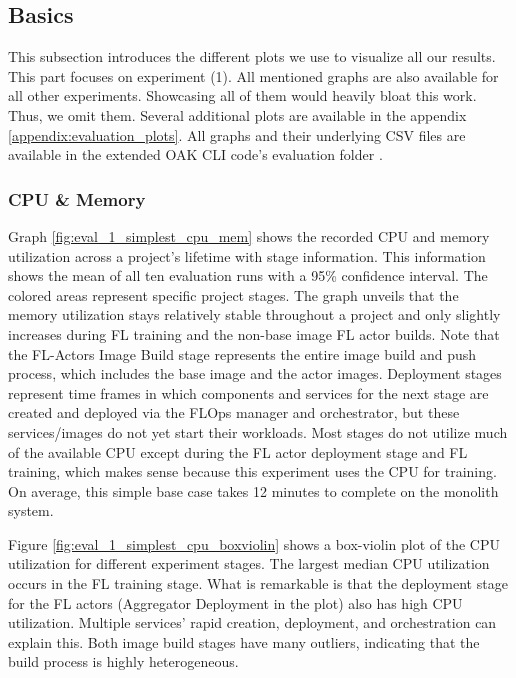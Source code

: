 \subsection{Basics} \label{subsection:eval_basics}

This subsection introduces the different plots we use to visualize all our results.
This part focuses on experiment (1).
All mentioned graphs are also available for all other experiments.
Showcasing all of them would heavily bloat this work.
Thus, we omit them.
Several additional plots are available in the appendix \ref{appendix:evaluation_plots}.
All graphs and their underlying CSV files are available in the extended OAK CLI code's evaluation folder \cite{cli_code}.


\subsubsection{CPU \& Memory}

Graph \ref{fig:eval_1_simplest_cpu_mem} shows the recorded CPU and memory utilization across a project's lifetime with stage information.
This information shows the mean of all ten evaluation runs with a 95\% confidence interval.
The colored areas represent specific project stages.
The graph unveils that the memory utilization stays relatively stable throughout a project and only slightly increases during FL training and the non-base image FL actor builds.
Note that the FL-Actors Image Build stage represents the entire image build and push process, which includes the base image and the actor images.
Deployment stages represent time frames in which components and services for the next stage are created and deployed via the FLOps manager and orchestrator, but these services/images do not yet start their workloads.
Most stages do not utilize much of the available CPU except during the FL actor deployment stage and FL training, which makes sense because this experiment uses the CPU for training.
On average, this simple base case takes 12 minutes to complete on the monolith system.

Figure \ref{fig:eval_1_simplest_cpu_boxviolin} shows a box-violin plot of the CPU utilization for different experiment stages.
The largest median CPU utilization occurs in the FL training stage.
What is remarkable is that the deployment stage for the FL actors (Aggregator Deployment in the plot) also has high CPU utilization.
Multiple services' rapid creation, deployment, and orchestration can explain this.
Both image build stages have many outliers, indicating that the build process is highly heterogeneous.

